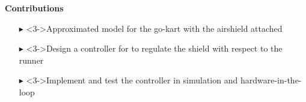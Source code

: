 \documentclass[9pt, aspectratio=169]{beamer}
\begin{document}
\begin{frame}[t]
 \textcolor{emph@Thesis}{\textbf{\small{Contributions}}} \\
\vspace{0.2cm}
\footnotesize
\begin{itemize}
	\footnotesize
	\item[$\blacktriangleright$] <3->Approximated model for the go-kart with the airshield attached
	\item[$\blacktriangleright$] <3->Design a controller for to regulate the shield with respect to the runner
	\item[$\blacktriangleright$] <3->Implement and test the controller in simulation and hardware-in-the-loop
\end{itemize}
\end{frame}


\end{document}
